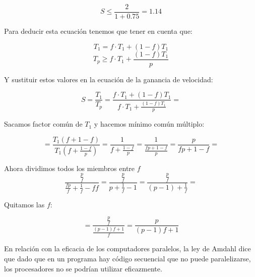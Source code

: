 \documentclass[10pt,a4paper,spanish]{report}
\begin{document}
\begin{displaymath}
S \leq \frac{2}{1+0.75} = 1.14
\end{displaymath}

\begin{center}
 \par
\end{center}

Para deducir esta ecuación tenemos que tener en cuenta que:

\begin{displaymath}
T_1 = f \cdot T_1 + (1 - f)T_1
\end{displaymath}
\begin{displaymath}
T_p \geq f \cdot T_1 + \frac{(1-f)T_1}{p}
\end{displaymath}

Y sustituir estos valores en la ecuación de la ganancia de velocidad:

\begin{displaymath}
S = \frac{T_1}{T_p} = \frac{f \cdot T_1 + (1 - f)T_1}{f \cdot T_1 + \frac{(1 - f)T_1}{p}} = 
\end{displaymath}

Sacamos factor común de $T_1$ y hacemos mínimo común múltiplo:

\begin{displaymath}
= \frac{T_1(f+1-f)}{T_1(f+\frac{1-f}{p})} = \frac{1}{f + \frac{1 - f}{p}} = \frac{1}{\frac{fp + 1 - f}{p}} = \frac{p}{fp + 1 - f} =
\end{displaymath}

Ahora dividimos todos los miembros entre $f$
\begin{displaymath}
\frac{\frac{p}{f}}{\frac{fp}{f}+\frac{1}{f}-{f}{f}} = \frac{\frac{p}{f}}{p+\frac{1}{f}-1} = \frac{\frac{p}{f}}{(p-1)+\frac{1}{f}} =
\end{displaymath}

Quitamos las $f$:

\begin{displaymath}
= \frac{\frac{p}{f}}{\frac{(p-1)f + 1}{f}} = \frac{p}{(p-1)f + 1}
\end{displaymath}

En relación con la eficacia de los computadores paralelos, la ley de Amdahl dice que dado que en un programa hay código secuencial que no puede paralelizarse, los procesadores no se podrían utilizar eficazmente.
\end{document}
